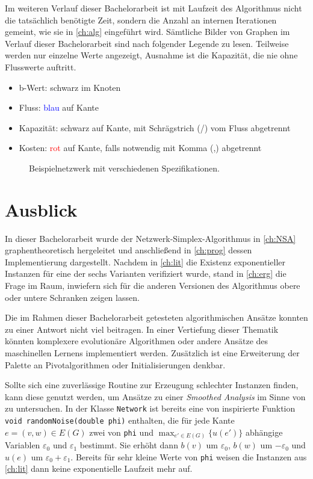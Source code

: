 \documentclass[11pt,a4paper,twoside,ngerman,openany,bibliography=totoc]{scrbook}
\theoremstyle{plain}
\theoremstyle{definition}
\begin{document}
Im weiteren Verlauf dieser Bachelorarbeit ist mit Laufzeit des Algorithmus nicht die tatsächlich benötigte Zeit, sondern die Anzahl an internen Iterationen gemeint, wie sie in \cref{ch:alg} eingeführt wird. Sämtliche Bilder von Graphen im Verlauf dieser Bachelorarbeit sind nach folgender Legende zu lesen. Teilweise werden nur einzelne Werte angezeigt, Ausnahme ist die Kapazität, die nie ohne Flusswerte auftritt.
\begin{itemize}\itemsep0em
    \item b-Wert: schwarz im Knoten
    \item Fluss: \textcolor{blue}{blau} auf Kante
    \item Kapazität: schwarz auf Kante, mit Schrägstrich (/) vom Fluss abgetrennt
    \item Kosten: \textcolor{red}{rot} auf Kante, falls notwendig mit Komma (,) abgetrennt
\end{itemize}

\begin{figure}[!ht]\centering
    
    \caption{Beispielnetzwerk mit verschiedenen Spezifikationen.}
    \label{fig:legende}
\end{figure}






\chapter{Ausblick}\label{ch:outro}
In dieser Bachelorarbeit wurde der Netzwerk-Simplex-Algorithmus in \cref{ch:NSA} graphentheoretisch hergeleitet und anschließend in \cref{ch:prog} dessen Implementierung dargestellt. Nachdem in \cref{ch:lit} die Existenz exponentieller Instanzen für eine der sechs Varianten verifiziert wurde, stand in \cref{ch:erg} die Frage im Raum, inwiefern sich für die anderen Versionen des Algorithmus obere oder untere Schranken zeigen lassen.

Die im Rahmen dieser Bachelorarbeit getesteten algorithmischen Ansätze konnten zu einer Antwort nicht viel beitragen. In einer Vertiefung dieser Thematik könnten komplexere evolutionäre Algorithmen oder andere Ansätze des maschinellen Lernens implementiert werden. Zusätzlich ist eine Erweiterung der Palette an Pivotalgorithmen oder Initialisierungen denkbar.

Sollte sich eine zuverlässige Routine zur Erzeugung schlechter Instanzen finden, kann diese genutzt werden, um Ansätze zu einer \emph{Smoothed Analysis} im Sinne von \cite{Roglin} zu untersuchen. In der Klasse \lstinline|Network| ist bereits eine von \cite{betreuer} inspirierte Funktion \lstinline|void randomNoise(double phi)| enthalten, die für jede Kante $e =(v,w)\in E(G)$ zwei von \lstinline|phi| und $\max_{e'\in E(G)}\{u(e')\}$ abhängige Variablen $\varepsilon_0$ und $\varepsilon_1$ bestimmt. Sie erhöht dann $b(v)$ um $\varepsilon_0$, $b(w)$ um $-\varepsilon_0$ und $u(e)$ um $\varepsilon_0+\varepsilon_1$. Bereits für sehr kleine Werte von \lstinline|phi| weisen die Instanzen aus \cref{ch:lit} dann keine exponentielle Laufzeit mehr auf.
\end{document}
